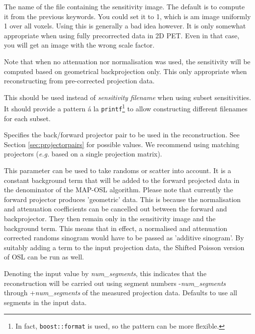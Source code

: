 \documentclass{article}
\begin{document}
{\begin{description}
The name of the file containing the sensitivity image. The 
default is to compute it from the previous keywords. You could 
set it to 1, which is am image uniformly 1 over all voxels. 
Using this is generally a bad idea however. It is 
only somewhat appropriate when using fully precorrected data 
in 2D PET. Even in that case, you will get an image with the 
wrong scale factor.

Note that when no attenuation nor normalisation was used, 
the sensitivity will be computed based on geometrical backprojection
only. This only appropriate when reconstructing 
from pre-corrected projection data.

\item[subset sensitivity filenames]
This should be used instead of \textit{sensitivity filename} when using subset
sensitivities. It should provide a pattern \'{a} la \texttt{printf}\footnote{In fact,
\texttt{boost::format} is used, so the pattern can be more flexible.} to allow
constructing different filenames for each subset.


\item[Projector pair type]
Specifies the back/forward projector pair to be used in the reconstruction. 
See Section \ref{sec:projectorpairs} for possible values. We recommend using matching
projectors (\textit{e.g.} based on a single projection matrix).


\item[additive\_sinogram]
This parameter can be used to take randoms or scatter into account. 
It is a constant background term that will be added to the forward 
projected data in the denominator of the MAP-OSL algorithm. Please 
note that currently the forward projector produces 'geometric' 
data. This is because the normalisation and attenuation coefficients 
can be cancelled out between the forward and backprojector. They 
then remain only in the sensitivity image and the background 
term. This means that in effect, a normalised and attenuation 
corrected randoms sinogram would have to be passed as 'additive 
sinogram'. By suitably adding a term to the input projection 
data, the Shifted Poisson version of OSL can be run as well.


\item[maximum absolute segment number to process]
Denoting the input value by \textit{num\_segments}, this indicates 
that the reconstruction will be carried out using segment numbers 
-\textit{num\_segments} through +\textit{num\_segments} of the measured 
projection data. Defaults to use all segments in the input data.



\end{description}}
\end{document}
